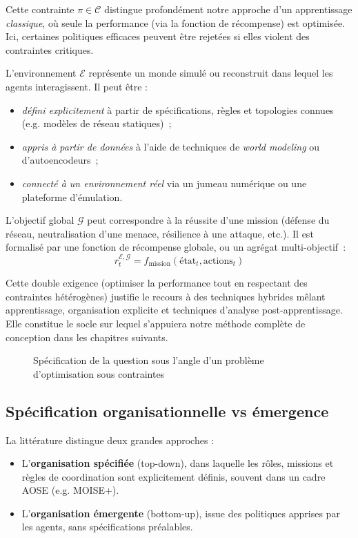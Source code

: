 Cette contrainte $\pi \in \mathcal{C}$ distingue profondément notre approche d’un apprentissage \textit{classique}, où seule la performance (via la fonction de récompense) est optimisée. Ici, certaines politiques efficaces peuvent être rejetées si elles violent des contraintes critiques.

L’environnement $\mathcal{E}$ représente un monde simulé ou reconstruit dans lequel les agents interagissent. Il peut être :
\begin{itemize}
    \item \emph{défini explicitement} à partir de spécifications, règles et topologies connues (e.g. modèles de réseau statiques)~;
    \item \emph{appris à partir de données} à l’aide de techniques de \textit{world modeling} ou d’autoencodeurs~;
    \item \emph{connecté à un environnement réel} via un jumeau numérique ou une plateforme d’émulation.
\end{itemize}

L’objectif global $\mathcal{G}$ peut correspondre à la réussite d’une mission (défense du réseau, neutralisation d’une menace, résilience à une attaque, etc.). Il est formalisé par une fonction de récompense globale, ou un agrégat multi-objectif~:
\[
    r^{\mathcal{E}, \mathcal{G}}_t = f_{\text{mission}}(\text{état}_t, \text{actions}_t)
\]

Cette double exigence (optimiser la performance tout en respectant des contraintes hétérogènes) justifie le recours à des techniques hybrides mêlant apprentissage, organisation explicite et techniques d’analyse post-apprentissage. Elle constitue le socle sur lequel s’appuiera notre méthode complète de conception dans les chapitres suivants.

\begin{figure}[H]
    \centering
    \resizebox{\textwidth}{!}{%
        
    }
    \caption{Spécification de la question sous l'angle d'un problème d'optimisation sous contraintes}
    \label{fig:constrained_optimization_overview}
\end{figure}

\subsection{Spécification organisationnelle vs émergence}

La littérature distingue deux grandes approches :
\begin{itemize}
    \item L’\textbf{organisation spécifiée} (top-down), dans laquelle les rôles, missions et règles de coordination sont explicitement définis, souvent dans un cadre AOSE (e.g. MOISE+).
    \item L’\textbf{organisation émergente} (bottom-up), issue des politiques apprises par les agents, sans spécifications préalables.
\end{itemize}

